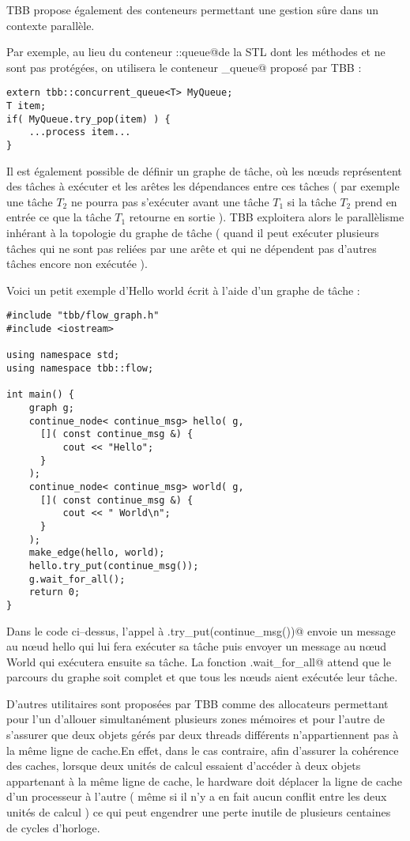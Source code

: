\documentclass[fleqn,11pt]{article}
\begin{document}
TBB propose également des conteneurs permettant une gestion sûre dans un contexte parallèle.

Par exemple, au lieu du conteneur \lstinline@std::queue@de la STL dont les méthodes
\lstinline@push@ et \lstinline@pop@ ne sont pas protégées, on utilisera le
conteneur \lstinline@concurrent_queue@ proposé par TBB : 
\begin{lstlisting}
extern tbb::concurrent_queue<T> MyQueue;
T item;
if( MyQueue.try_pop(item) ) {
    ...process item...
}
\end{lstlisting}

Il est également possible de définir un graphe de tâche, où les n{\oe}uds représentent
des tâches à exécuter et les arêtes les dépendances entre ces tâches ( par exemple une tâche
$T_{2}$ ne pourra pas s'exécuter avant une tâche $T_{1}$ si la tâche $T_{2}$ prend en entrée
ce que la tâche $T_{1}$ retourne en sortie ). TBB exploitera alors le parallèlisme
inhérant à la topologie du graphe de tâche ( quand il peut exécuter plusieurs tâches qui ne sont pas reliées
par une arête et qui ne dépendent pas d'autres tâches encore non exécutée ). 

Voici un petit exemple d'Hello  world écrit à l'aide d'un graphe de tâche :

\begin{lstlisting}
#include "tbb/flow_graph.h"
#include <iostream>

using namespace std;
using namespace tbb::flow;

int main() {
    graph g;
    continue_node< continue_msg> hello( g,
      []( const continue_msg &) {
          cout << "Hello";
      }
    );
    continue_node< continue_msg> world( g,
      []( const continue_msg &) {
          cout << " World\n";
      }
    );
    make_edge(hello, world);
    hello.try_put(continue_msg());
    g.wait_for_all();
    return 0;
}
\end{lstlisting}

Dans le code ci--dessus, l'appel à \lstinline@hello.try_put(continue_msg())@
envoie un message au n{\oe}ud hello qui lui fera exécuter sa tâche puis envoyer
un message au n{\oe}ud World qui exécutera ensuite sa tâche. La fonction
\verb@g.wait_for_all@ attend que le parcours du graphe soit complet et que tous
les n{\oe}uds aient exécutée leur tâche.

D'autres utilitaires sont proposées par TBB comme des allocateurs permettant pour l'un
d'allouer simultanément plusieurs zones mémoires et pour l'autre de s'assurer que deux objets
gérés par deux threads différents n'appartiennent pas à la même ligne de cache.En effet, dans
le cas contraire, afin d'assurer la cohérence des caches, lorsque deux unités de calcul essaient
d'accéder à deux objets appartenant à la même ligne de cache, le hardware doit déplacer la ligne
de cache d'un processeur à l'autre ( même si il n'y a en fait aucun conflit entre les deux
unités de calcul ) ce qui peut engendrer une perte inutile de plusieurs centaines de cycles
d'horloge.
\end{document}
